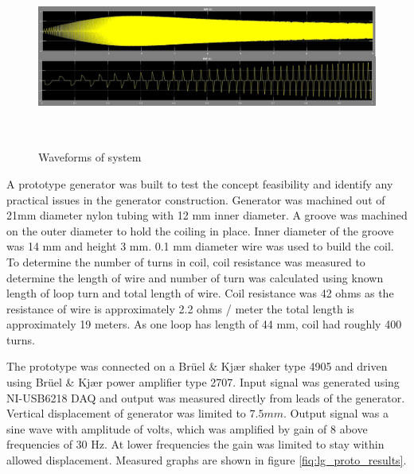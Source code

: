 \begin{figure}[htb]
  \begin{center}
  \includegraphics[height=6cm]{images/own_dwg/simulink_waveforms.jpg}
  \end{center}
  \caption{\label{femm_forces} Waveforms of system}
\end{figure}

A prototype generator was built to test the concept feasibility and identify any practical issues in the generator construction. Generator was machined out of 21mm diameter nylon tubing with 12 mm inner diameter. A groove was machined on the outer diameter to hold the coiling in place. Inner diameter of the groove was 14 mm and height 3 mm. 0.1 mm diameter wire was used to build the coil. To determine the number of turns in coil, coil resistance was measured to determine the length of wire and number of turn was calculated using known length of loop turn and total length of wire. Coil resistance was 42 ohms as the resistance of wire is approximately 2.2 ohms / meter the total length is approximately 19 meters. As one loop has length of 44 mm, coil had roughly 400 turns. 

The prototype was connected on a  Brüel & Kjær shaker type 4905 and driven using  Brüel & Kjær power amplifier type 2707. Input signal was generated using NI-USB6218 DAQ and output was measured directly from leads of the generator. Vertical displacement of generator was limited to $7.5 mm$. Output signal was a sine wave with amplitude of  volts, which was amplified by gain of 8 above frequencies of 30 Hz. At lower frequencies the gain was limited to stay within allowed displacement. Measured graphs are shown in figure \ref{fiq:lg_proto_results}.

